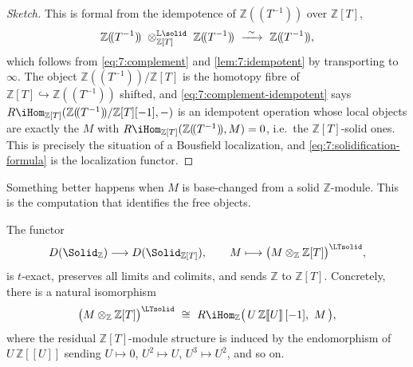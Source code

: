 \begin{proof}[Sketch]
This is formal from the idempotence of $\mathbb{Z}(\!(T^{-1})\!)$ over
$\mathbb{Z}[T]$,
\begin{equation}
\label{eq:7:complement-idempotent}
\mathbb{Z}(\!(T^{-1})\!)\ \otimes^{\mathbb{L}\solid}_{\mathbb{Z}[T]}\
\mathbb{Z}(\!(T^{-1})\!)\ \xrightarrow{\ \sim\ }\ \mathbb{Z}(\!(T^{-1})\!),
\end{equation}
which follows from \eqref{eq:7:complement} and \cref{lem:7:idempotent} by
transporting to $\infty$. The object $\mathbb{Z}(\!(T^{-1})\!)/\mathbb{Z}[T]$
is the homotopy fibre of $\mathbb{Z}[T]\hookrightarrow\mathbb{Z}(\!(T^{-1})\!)$
shifted, and \eqref{eq:7:complement-idempotent} says $R\iHom_{\mathbb{Z}[T]}
(\mathbb{Z}(\!(T^{-1})\!)/\mathbb{Z}[T][-1],-)$ is an idempotent operation
whose local objects are exactly the $M$ with
$R\iHom_{\mathbb{Z}[T]}(\mathbb{Z}(\!(T^{-1})\!),M)=0$, i.e.\ the
$\mathbb{Z}[T]$-solid ones. This is precisely the situation of a Bousfield
localization, and \eqref{eq:7:solidification-formula} is the localization
functor.
\end{proof}

Something better happens when $M$ is base-changed from a solid
$\mathbb{Z}$-module. This is the computation that identifies the free objects.

\begin{proposition}
\label{prop:7:pushforward}
The functor
\begin{equation}
\label{eq:7:pushforward}
D(\Solid_{\mathbb{Z}})\longrightarrow D(\Solid_{\mathbb{Z}[T]}),\qquad
M\longmapsto\bigl(M\otimes_{\mathbb{Z}}\mathbb{Z}[T]\bigr)^{\LTsolid},
\end{equation}
is $t$-exact, preserves all limits and colimits, and sends $\mathbb{Z}$ to
$\mathbb{Z}[T]$. Concretely, there is a natural isomorphism
\begin{equation}
\label{eq:7:pushforward-formula}
\bigl(M\otimes_{\mathbb{Z}}\mathbb{Z}[T]\bigr)^{\LTsolid}\ \cong\
R\iHom_{\mathbb{Z}}\bigl(\,U\,\mathbb{Z}[\![U]\!]\,[-1],\ M\,\bigr),
\end{equation}
where the residual $\mathbb{Z}[T]$-module structure is induced by the
endomorphism of $U\,\mathbb{Z}[\![U]\!]$ sending $U\mapsto0$, $U^2\mapsto U$,
$U^3\mapsto U^2$, and so on.
\end{proposition}


